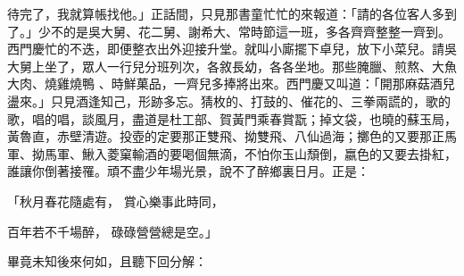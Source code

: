 \begin{showcontents}{}
待完了，我就算帳找他。」正話間，只見那書童忙忙的來報道：「請的各位客人多到了。」少不的是吳大舅、花二舅、謝希大、常時節這一班，多各齊齊整整一齊到。西門慶忙的不迭，即便整衣出外迎接升堂。就叫小廝擺下卓兒，放下小菜兒。請吳大舅上坐了，眾人一行兒分班列次，各敘長幼，各各坐地。那些腌臘、煎熬、大魚大肉、燒雞燒鴨 、時鮮菓品，一齊兒多捧將出來。西門慶又叫道：「開那麻菇酒兒盪來。」只見酒逢知己，形跡多忘。猜枚的、打鼓的、催花的、三拳兩謊的，歌的歌，唱的唱，談風月，盡道是杜工部、賀黃門乘春賞翫；掉文袋，也曉的蘇玉局，黃魯直，赤壁清遊。投壺的定要那正雙飛、拗雙飛、八仙過海；擲色的又要那正馬軍、拗馬軍、鰍入菱窠輸酒的要喝個無滴，不怕你玉山頹倒，嬴色的又要去掛紅，誰讓你倒著接罹。頑不盡少年場光景，說不了醉鄉裏日月。正是：

「秋月春花隨處有，  賞心樂事此時同，

百年若不千場醉，  碌碌營營總是空。」

畢竟未知後來何如，且聽下回分解：





\end{showcontents}


